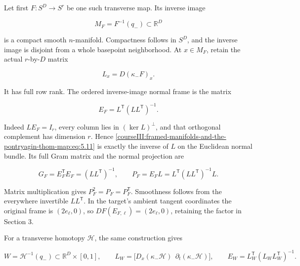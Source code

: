 Let first \(F:S^D\to S^r\) be one such transverse map. Its inverse image

\begin{equation}
M_F=F^{-1}(q_-)\subset\mathbb R^D
 \label{courseIII:framed-manifolds-and-the-pontryagin-thom-map:eq:5.9}
\end{equation}

is a compact smooth \(n\)-manifold. Compactness follows in \(S^D\), and the inverse image is disjoint from a whole basepoint neighborhood. At \(x\in M_F\), retain the actual \(r\)-by-\(D\) matrix

\begin{equation}
L_x=D(\kappa_-F)_x.
 \label{courseIII:framed-manifolds-and-the-pontryagin-thom-map:eq:5.10}
\end{equation}

It has full row rank. The ordered inverse-image normal frame is the matrix

\begin{equation}
E_F=L^{\mathsf T}(LL^{\mathsf T})^{-1}.
 \label{courseIII:framed-manifolds-and-the-pontryagin-thom-map:eq:5.11}
\end{equation}

Indeed \(LE_F=I_r\), every column lies in \((\ker L)^\perp\), and that orthogonal complement has dimension \(r\). Hence \eqref{courseIII:framed-manifolds-and-the-pontryagin-thom-map:eq:5.11} is exactly the inverse of \(L\) on the Euclidean normal bundle. Its full Gram matrix and the normal projection are

\begin{equation}
G_F=E_F^{\mathsf T}E_F=(LL^{\mathsf T})^{-1},
 \qquad
 P_F=E_FL=L^{\mathsf T}(LL^{\mathsf T})^{-1}L.
 \label{courseIII:framed-manifolds-and-the-pontryagin-thom-map:eq:5.12}
\end{equation}

Matrix multiplication gives \(P_F^2=P_F=P_F^{\mathsf T}\). Smoothness follows from the everywhere invertible \(LL^{\mathsf T}\). In the target's ambient tangent coordinates the original frame is \((2e_\ell,0)\), so \(DF(E_{F,\ell})=(2e_\ell,0)\), retaining the factor in Section 3.

For a transverse homotopy \(\mathcal H\), the same construction gives

\begin{equation}
W=\mathcal H^{-1}(q_-)\subset\mathbb R^D\times[0,1],
 \qquad
 L_W=\bigl[D_x(\kappa_-\mathcal H)\ \ 
                    \partial_t(\kappa_-\mathcal H)\bigr],
 \qquad
 E_W=L_W^{\mathsf T}(L_WL_W^{\mathsf T})^{-1}.
 \label{courseIII:framed-manifolds-and-the-pontryagin-thom-map:eq:5.13}
\end{equation}


